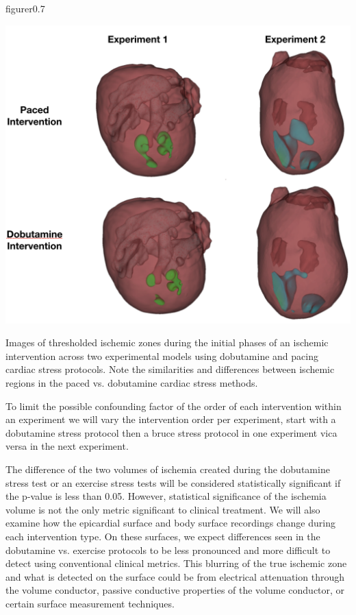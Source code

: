 \begin{wrapfloat}{figure}{r}{0.7\textwidth}
	\begin{center}
		{\includegraphics[width=.7\textwidth]
			{../Figures/DobutvsPacing.png}}
		\captionsetup{width = .7\textwidth}
		\caption{\small \label{fig:dobutPacingThreshold} Images of thresholded ischemic zones during the initial phases of an ischemic intervention across two experimental models using dobutamine and pacing cardiac stress protocols. Note the similarities and differences between ischemic regions in the paced vs. dobutamine cardiac stress methods. }
	\end{center}
\end{wrapfloat}

To limit the possible confounding factor of the order of each intervention within an experiment we will vary the intervention order per experiment, \ie{} start with a dobutamine stress protocol then a bruce stress protocol in one experiment vica versa in the next experiment. 

The difference of the two volumes of ischemia created during the dobutamine stress test or an exercise stress tests will be considered statistically significant if the p-value is less than 0.05. However, statistical significance of the ischemia volume is not the only metric significant to clinical treatment. We will also examine how the epicardial surface and body surface recordings change during each intervention type. On these surfaces, we expect differences seen in the dobutamine vs. exercise protocols to be less pronounced and more difficult to detect using conventional clinical metrics. This blurring of the true ischemic zone and what is detected on the surface could be from electrical attenuation through the volume conductor, passive conductive properties of the volume conductor, or certain surface measurement techniques. 


